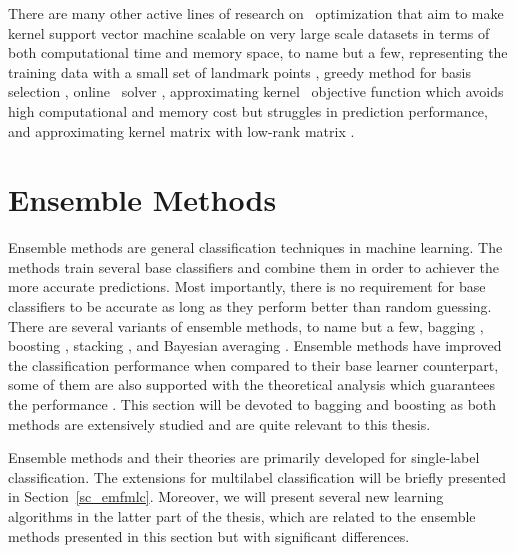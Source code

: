 {There are many other active lines of research on \svm\ optimization that aim to make kernel support vector machine scalable on very large scale datasets in terms of both computational time and memory space, to name but a few, representing the training data with a small set of landmark points \citep{Pavlov00towards,Boley04training,Yu05making,Zhang08improved}, greedy method for basis selection \citep{Keerthi06building}, online \svm\ solver \citep{Bordes05fast}, approximating kernel \svm\ objective function \citep{Zhang12scaling, Le13fast} which avoids high computational and memory cost but struggles in prediction performance, and approximating kernel matrix with low-rank matrix \citep{Smola00sparse,Fine02efficient,Drineas05on,Si14memory}.
\fi


%
%
%
\section{Ensemble Methods} \label{sc_em}

Ensemble methods are general classification techniques in machine learning.
The methods train several base classifiers and combine them in order to achiever the more accurate predictions.
Most importantly, there is no requirement for base classifiers to be accurate as long as they perform better than random guessing.
There are several variants of ensemble methods, to name but a few, 
bagging \citep{Breiman96bagging}, 
boosting \citep{Freund97a,Schapire99improved}, 
stacking \citep{Smyth99linearly}, 
and Bayesian averaging \citep{Freund04generalization}.
Ensemble methods have improved the classification performance when compared to their base learner counterpart, some of them are also supported with the theoretical analysis which guarantees the performance \citep{Schapire97boosting,Koltchinskii00empirical,Cortes14semble,Cortes14deep}.
This section will be devoted to bagging and boosting as both methods are extensively studied and are quite relevant to this thesis.

Ensemble methods and their theories are primarily developed for single-label classification.
The extensions for multilabel classification will be briefly presented in Section~\ref{sc_emfmlc}.
Moreover, we will present several new learning algorithms in the latter part of the thesis, which are related to the ensemble methods presented in this section but with significant differences.



}
